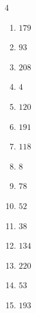 \begin{multicols}{4}
\begin{enumerate}

  \item $179$


  \item $93$


  \item $208$


\columnbreak %

  \item $4$


  \item $120$


  \item $191$


  \item $118$


  \item $8$


  \item $78$


  \item $52$


  \item $38$


  \item $134$


  \item $220$


  \item $53$


  \item $193$



\end{enumerate}
\end{multicols}
